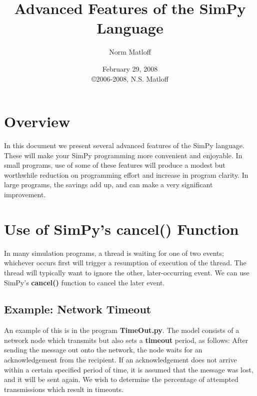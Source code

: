 \documentclass[11pt]{article}
\begin{document}
\title{Advanced Features of the SimPy Language}

\author{Norm Matloff}

\date{February 29, 2008 \\
\copyright{}2006-2008, N.S. Matloff} 

\maketitle

\tableofcontents{}

\newpage

\section{Overview}

In this document we present several advanced features of the SimPy
language.  These will make your SimPy programming more convenient and
enjoyable.  In small programs, use of some of these features will
produce a modest but worthwhile reduction on programming effort and
increase in program clarity.  In large programs, the savings add up, and
can make a very significant improvement.

\section{ Use of SimPy's {\bf cancel() Function}}

In many simulation programs, a thread is waiting for one of two events;
whichever occurs first will trigger a resumption of execution of the thread.
The thread will typically want to ignore the other, later-occurring event. We
can use SimPy's {\bf cancel()} function to cancel the later event.

\subsection{Example:  Network Timeout}
\label{nettimeout}

An example of this is in the program {\bf TimeOut.py}. The model
consists of a network node which transmits but also sets a {\bf timeout}
period, as follows:  After sending the message out onto the network, the
node waits for an acknowledgement from the recipient.  If an
acknowledgement does not arrive within a certain specified period of
time, it is assumed that the message was lost, and it will be sent
again.  We wish to determine the percentage of attempted transmissions
which result in timeouts. 
\end{document}
